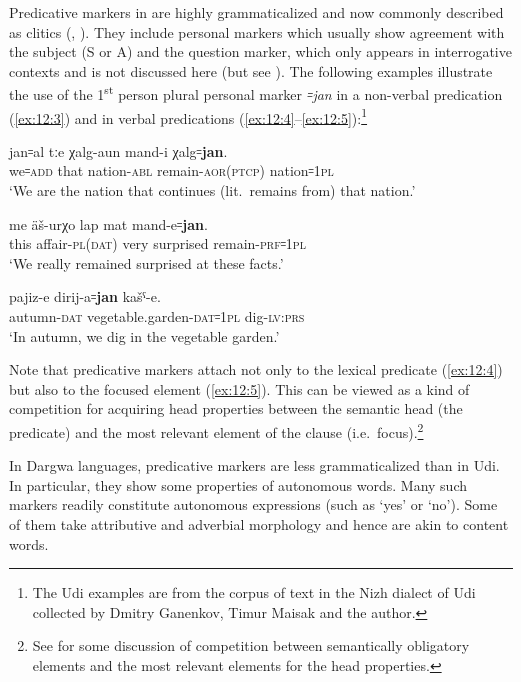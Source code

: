 ﻿\documentclass[output=paper]{langsci/langscibook}
\begin{document}
Predicative markers in  are highly grammaticalized and now commonly
described as clitics (\citealt{harris2000}, \citeyear{harris2002}). They include personal markers
which usually show agreement with the subject (S or A) and the question
marker, which only appears in interrogative contexts and is not
discussed here (but see \citealt{harris1992}). The following examples illustrate
the use of the 1\textsuperscript{st} person plural personal marker
\emph{꞊jan} in a non-verbal predication (\ref{ex:12:3}) and in verbal predications
(\ref{ex:12:4}–\ref{ex:12:5}):\footnote{The Udi examples are from the corpus of text in the
  Nizh dialect of Udi collected by Dmitry Ganenkov, Timur Maisak and the
  author.}

\ea \label{ex:12:3} %
\gll jan꞊al tːe χalg-aun mand-i χalg꞊\textbf{jan}.\\
we꞊\textsc{add} that nation-\textsc{abl} remain-\textsc{aor}(\textsc{ptcp}) nation꞊1\textsc{pl}\\
\glt `We are the nation that continues (lit.\ remains from) that nation.'

\ex \label{ex:12:4} %
\gll me äš-urχo lap mat mand-e꞊\textbf{jan}.\\
this affair-\textsc{pl}(\textsc{dat}) very surprised remain-\textsc{prf}꞊\textsc{1pl}\\
\glt `We really remained surprised at these facts.'

\ex \label{ex:12:5} %
\gll pajiz-e dirij-a꞊\textbf{jan} kašˤ-e.\\
autumn-\textsc{dat} vegetable.garden-\textsc{dat}꞊1\textsc{pl} dig-\textsc{lv}:\textsc{prs}\\
\glt `In autumn, we dig in the vegetable garden.'
\z

Note that predicative markers attach not only to the lexical predicate (\ref{ex:12:4})
but also to the focused element (\ref{ex:12:5}). This can be viewed as a kind of
competition for acquiring head properties between the semantic head (the
predicate) and the most relevant element of the clause (i.e.\
focus).\footnote{See \citet{lander2009} for some discussion of competition
  between semantically obligatory elements and the most relevant
  elements for the head properties.}

In Dargwa languages, predicative markers are less grammaticalized than
in Udi. In particular, they show some properties of autonomous words.
Many such markers readily constitute autonomous expressions (such as
`yes' or `no'). Some of them take attributive and adverbial morphology
and hence are akin to content words.
\end{document}
